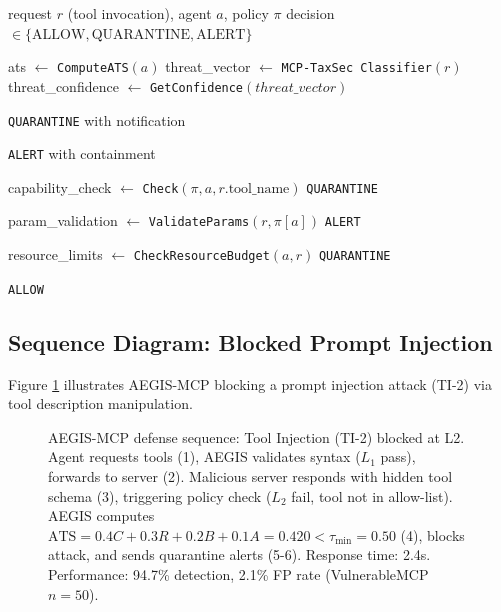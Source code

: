 \documentclass[12pt,twocolumn,journal]{IEEEtran}
\begin{document}
\begin{algorithm}
\caption{AEGIS-MCP Runtime Policy Enforcer}
\label{alg:enforcer}
\begin{algorithmic}
\REQUIRE request $r$ (tool invocation), agent $a$, policy $\pi$
\ENSURE decision $\in \{\text{ALLOW}, \text{QUARANTINE}, \text{ALERT}\}$

\STATE ats $\leftarrow$ \texttt{ComputeATS}$(a)$
\STATE threat\_vector $\leftarrow$ \texttt{MCP-TaxSec Classifier}$(r)$
\STATE threat\_confidence $\leftarrow$ \texttt{GetConfidence}$(threat\_vector)$

    \RETURN \texttt{QUARANTINE} with notification
\ENDIF

    \RETURN \texttt{ALERT} with containment
\ENDIF

\STATE capability\_check $\leftarrow$ \texttt{Check}$(\pi, a, r.\text{tool\_name})$
    \RETURN \texttt{QUARANTINE}
\ENDIF

\STATE param\_validation $\leftarrow$ \texttt{ValidateParams}$(r, \pi[a])$
    \RETURN \texttt{ALERT}
\ENDIF

\STATE resource\_limits $\leftarrow$ \texttt{CheckResourceBudget}$(a, r)$
    \RETURN \texttt{QUARANTINE}
\ENDIF

\RETURN \texttt{ALLOW}
\end{algorithmic}
\end{algorithm}

\subsection{Sequence Diagram: Blocked Prompt Injection}

Figure \ref{fig:sequence} illustrates AEGIS-MCP blocking a prompt injection attack (TI-2) via tool description manipulation.

\begin{figure}[!t]
\centering

\caption{AEGIS-MCP defense sequence: Tool Injection (TI-2) blocked at L2. Agent requests tools (1), AEGIS validates syntax ($L_1$ pass), forwards to server (2). Malicious server responds with hidden tool schema (3), triggering policy check ($L_2$ fail, tool not in allow-list). AEGIS computes $\mathrm{ATS} = 0.4C + 0.3R + 0.2B + 0.1A = 0.420 < \tau_{\min}=0.50$ (4), blocks attack, and sends quarantine alerts (5-6). Response time: 2.4s. Performance: 94.7\% detection, 2.1\% FP rate (VulnerableMCP $n=50$).}
\label{fig:sequence}
\end{figure}
\end{document}
